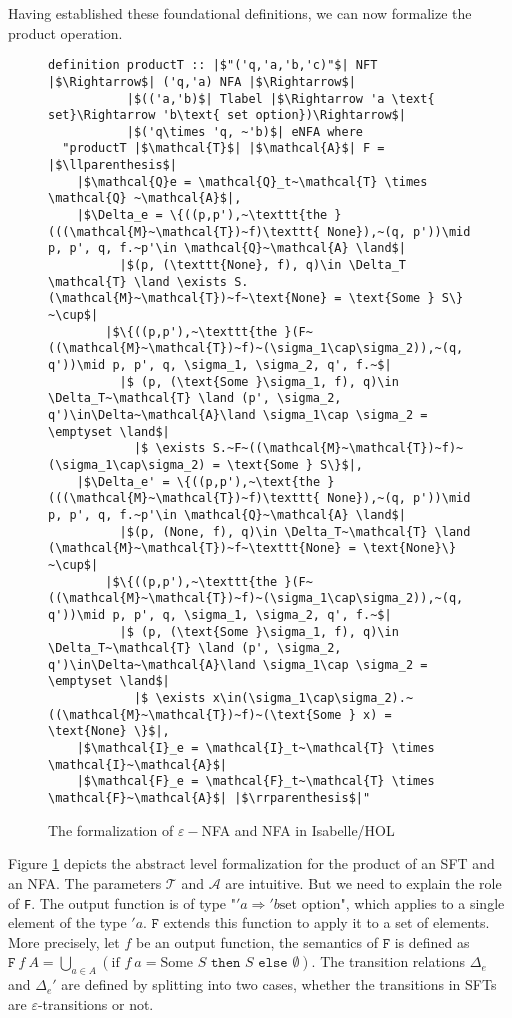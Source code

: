 \documentclass[a4paper,UKenglish,cleveref, autoref, anonymous, thm-restate]{lipics-v2021}
\begin{document}
Having established these foundational definitions, we can now formalize the product operation. 

\begin{figure}[hbt!]
	\begin{lstlisting}
definition productT :: |$"('q,'a,'b,'c)"$| NFT |$\Rightarrow$| ('q,'a) NFA |$\Rightarrow$| 
           |$(('a,'b)$| Tlabel |$\Rightarrow 'a \text{ set}\Rightarrow 'b\text{ set option})\Rightarrow$|
           |$('q\times 'q, ~'b)$| eNFA where
  "productT |$\mathcal{T}$| |$\mathcal{A}$| F = |$\llparenthesis$|
    |$\mathcal{Q}e = \mathcal{Q}_t~\mathcal{T} \times \mathcal{Q} ~\mathcal{A}$|,
    |$\Delta_e = \{((p,p'),~\texttt{the }(((\mathcal{M}~\mathcal{T})~f)\texttt{ None}),~(q, p'))\mid p, p', q, f.~p'\in \mathcal{Q}~\mathcal{A} \land$|
          |$(p, (\texttt{None}, f), q)\in \Delta_T \mathcal{T} \land \exists S. (\mathcal{M}~\mathcal{T})~f~\text{None} = \text{Some } S\} ~\cup$|
        |$\{((p,p'),~\texttt{the }(F~((\mathcal{M}~\mathcal{T})~f)~(\sigma_1\cap\sigma_2)),~(q, q'))\mid p, p', q, \sigma_1, \sigma_2, q', f.~$|
          |$ (p, (\text{Some }\sigma_1, f), q)\in \Delta_T~\mathcal{T} \land (p', \sigma_2, q')\in\Delta~\mathcal{A}\land \sigma_1\cap \sigma_2 = \emptyset \land$|
            |$ \exists S.~F~((\mathcal{M}~\mathcal{T})~f)~(\sigma_1\cap\sigma_2) = \text{Some } S\}$|,
    |$\Delta_e' = \{((p,p'),~\text{the }(((\mathcal{M}~\mathcal{T})~f)\texttt{ None}),~(q, p'))\mid p, p', q, f.~p'\in \mathcal{Q}~\mathcal{A} \land$|
          |$(p, (None, f), q)\in \Delta_T~\mathcal{T} \land (\mathcal{M}~\mathcal{T})~f~\texttt{None} = \text{None}\} ~\cup$|
        |$\{((p,p'),~\texttt{the }(F~((\mathcal{M}~\mathcal{T})~f)~(\sigma_1\cap\sigma_2)),~(q, q'))\mid p, p', q, \sigma_1, \sigma_2, q', f.~$|
          |$ (p, (\text{Some }\sigma_1, f), q)\in \Delta_T~\mathcal{T} \land (p', \sigma_2, q')\in\Delta~\mathcal{A}\land \sigma_1\cap \sigma_2 = \emptyset \land$|
            |$ \exists x\in(\sigma_1\cap\sigma_2).~((\mathcal{M}~\mathcal{T})~f)~(\text{Some } x) = \text{None} \}$|,
    |$\mathcal{I}_e = \mathcal{I}_t~\mathcal{T} \times \mathcal{I}~\mathcal{A}$|
    |$\mathcal{F}_e = \mathcal{F}_t~\mathcal{T} \times \mathcal{F}~\mathcal{A}$| |$\rrparenthesis$|"
	\end{lstlisting}
\caption{The formalization of $\varepsilon-$NFA and NFA in Isabelle/HOL}
\label{fig-def-FTProd}
\end{figure}

Figure \ref{fig-def-FTProd} depicts the abstract level formalization for the product of an SFT and an NFA. The parameters $\mathcal{T}$ and $\mathcal{A}$ are intuitive. But we need to explain the role of \texttt{F}. The output function is of type "$'a \Rightarrow 'b \text{set option}$", which applies to a single element of the type $'a$. $\texttt{F}$ extends this function to apply it to a set of elements. More precisely, let $f$ be an output function, the semantics of $\texttt{F}$ is defined as $\texttt{F}~f~A=\bigcup_{a\in A} (\text{if }f~a= \text{Some }S \texttt{ then } S \texttt{ else } \emptyset)$.
The transition relations $\Delta_e$ and $\Delta_e'$ are defined by splitting into two cases, whether the transitions in SFTs are $\varepsilon$-transitions or not.
\end{document}
